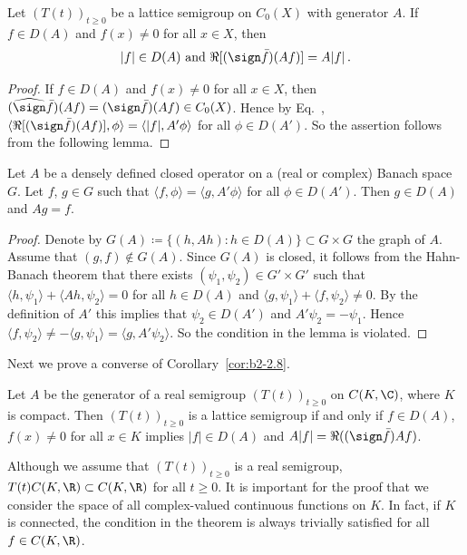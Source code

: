 \begin{corollary}\label{cor:b2-2.8}
Let $(T(t))_{t \geq 0}$ be a lattice semigroup on $C_{0}(X)$ with generator $A$.
If\/ $f \in D(A)$ and $f(x) \neq 0$ for all $x \in X$, then 
\[
|f| \in D(A) \text{ and } \Re[(\sign \bar{f})(Af)] = A|f|\,.
\]
\end{corollary}
\begin{proof}
If\/ $f \in D(A)$ and $f(x) \neq 0$ for all $x \in X$, then $(\widehat{\sign} \bar{f})(Af) = (\sign \bar{f})(Af) \in C_{0}(X)$.
Hence by Eq.~, $\langle \Re[(\sign \bar{f})(Af)],\phi \rangle = \langle |f|,A'\phi \rangle$ for all $\phi \in D(A')$.
So the assertion follows from the following lemma.
\end{proof}
\begin{lemma}\label{lem:b2-2.9}
Let $A$ be a densely defined closed operator on a (real or complex) Banach space $G$.
Let $f$, $g \in G$ such that $\langle f,\phi \rangle = \langle g,A'\phi \rangle$ for all $\phi \in D(A')$.
Then $g \in D(A)$ and $Ag = f$.
\end{lemma}
\begin{proof}
Denote by $G(A) \coloneqq \{(h,Ah) \colon h \in D(A)\} \subset G \times G$ the graph of\/ $A$.
Assume that $(g,f) \notin G(A)$.
Since $G(A)$ is closed, it follows from the Hahn-Banach theorem that there exists $(\psi_{1},\psi_{2}) \in G' \times G'$ such that $\langle h,\psi_{1} \rangle + \langle Ah,\psi_{2} \rangle = 0$ for all $h \in D(A)$ and $\langle g,\psi_{1} \rangle + \langle f,\psi_{2} \rangle \neq 0$.
By the definition of\/ $A'$ this implies that $\psi_{2} \in D(A')$ and $A'\psi_{2} = -\psi_{1}$.
Hence $\langle f,\psi_{2} \rangle \neq -\langle g,\psi_{1} \rangle = \langle g,A'\psi_{2} \rangle$.
So the condition in the lemma is violated.
\end{proof}
Next we prove a converse of Corollary~\ref{cor:b2-2.8}.
\begin{theorem}\label{thm:b2-2.10}
Let $A$ be the generator of a real semigroup $(T(t))_{t \geq 0}$ on $C(K,\C)$, where $K$ is compact.
Then $(T(t))_{t \geq 0}$ is a lattice semigroup if and only if\/ $f \in D(A)$, $f(x) \neq 0$ for all $x \in K$ implies $|f| \in D(A)$ and $A|f| = \Re((\sign \bar{f})Af)$.
\end{theorem}
\begin{remark*}\label{rem:b2-2.10-KGK}
Although we assume that $(T(t))_{t \geq 0}$ is a real semigroup, \ie $T(t)C(K,\R) \subset C(K,\R)$ for all $t \geq 0$.
It is important for the proof that we consider the space of all complex-valued continuous functions on $K$.
In fact, if\/ $K$ is connected, the condition in the theorem is always trivially satisfied for all $f \in C(K,\R)$.
\end{remark*}
